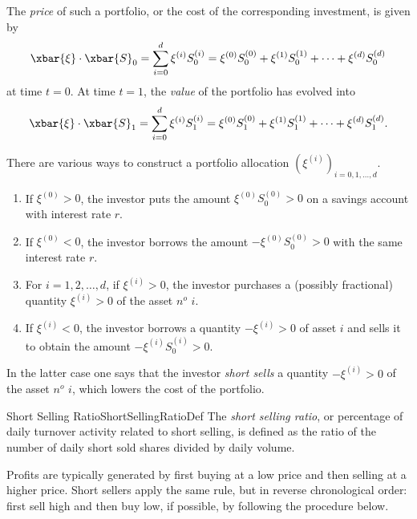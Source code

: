 \noindent The \textit{price} of such a portfolio, or the cost of the corresponding investment, is given by
\begin{equation} \label{eq:PortfolioPriceT0}
    \xbar{\xi} \cdot \xbar{S}_0 = \sum_{i=0}^d \xi^{(i)} S_0^{(i)} = \xi^{(0)} S_0^{(0)} + \xi^{(1)} S_0^{(1)} + \dots + \xi^{(d)} S_0^{(d)}
\end{equation}
at time $t=0$. At time $t=1$, the \textit{value} of the portfolio has evolved into
\begin{equation} \label{eq:PortfolioValueT1}
    \xbar{\xi} \cdot \xbar{S}_1 = \sum_{i=0}^d \xi^{(i)} S_1^{(i)} = \xi^{(0)} S_1^{(0)} + \xi^{(1)} S_1^{(1)} + \dots + \xi^{(d)} S_1^{(d)}.
\end{equation}

\noindent There are various ways to construct a portfolio allocation $(\xi^{(i)})_{i=0,1,\dots,d}$.

\begin{enumerate}[label=\roman*), leftmargin=*, parsep=6pt]
    \item If $\xi^{(0)} > 0$, the investor puts the amount $\xi^{(0)} S_0^{(0)} > 0$ on a savings account with interest rate $r$.

    \item If $\xi^{(0)} < 0$, the investor borrows the amount $-\xi^{(0)} S_0^{(0)} > 0$ with the same interest rate $r$.

    \item For $i = 1, 2, \dots, d$, if $\xi^{(i)} > 0$, the investor purchases a (possibly fractional) quantity $\xi^{(i)} > 0$ of the asset $n^o$ $i$.

    \item If $\xi^{(i)} < 0$, the investor borrows a quantity $-\xi^{(i)} > 0$ of asset $i$ and sells it to obtain the amount $-\xi^{(i)} S_0^{(i)} > 0$.
\end{enumerate}

\noindent In the latter case one says that the investor \textit{short sells} a quantity $-\xi^{(i)} > 0$ of the asset $n^o$ $i$, which lowers the cost of the portfolio.

\begin{defn}{Short Selling Ratio}{ShortSellingRatioDef}
    The \textit{short selling ratio}, or percentage of daily turnover activity related to short selling, is defined as the ratio of the number of daily short sold shares divided by daily volume.
\end{defn}

\noindent Profits are typically generated by first buying at a low price and then selling at a higher price. Short sellers apply the same rule, but in reverse chronological order: first sell high and then buy low, if possible, by following the procedure below.

